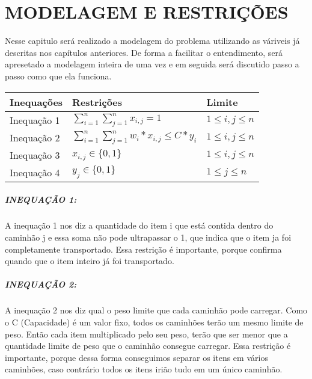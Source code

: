 \chapter{MODELAGEM E RESTRIÇÕES}
  Nesse capitulo será realizado a modelagem do problema utilizando as váriveis já descritas nos capítulos anteriores. De forma a facilitar o entendimento, será apresetado a modelagem inteira de uma vez e em seguida será discutido passo a passo como que ela funciona. 
  \begin{center}
    \begin{tabular}{|p{3cm}|p{5cm}|p{3cm}|}
      \hline
        Inequações & Restrições & Limite \\ 
      \hline
        Inequação 1 & \( \sum_{i=1}^{n} \sum_{j=1}^{n} x_{i,j} = 1\) & \( 1 \leq i,j \leq n  \)\\
      \hline
        Inequação 2 & \( \sum_{i=1}^{n} \sum_{j=1}^{n} w_{i}*x_{i,j} \leq C*y_{i}\) & \( 1 \leq i,j \leq n  \)\\
      \hline
        Inequação 3 & \(  x_{i,j} \in \{0,1\}  \) & \( 1 \leq i,j \leq n  \)\\
      \hline
        Inequação 4 & \(  y_{j} \in \{0, 1\} \) & \( 1 \leq j \leq n  \)\\
      \hline
    \end{tabular}
  \end{center}

\paragraph{INEQUAÇÃO 1:}
  A inequação 1 nos diz a quantidade do item i que está contida dentro do caminhão j e essa soma não pode ultrapassar o 1, que indica que o item ja foi completamente transportado. Essa restrição é importante, porque confirma quando que o item inteiro já foi transportado. \\

\paragraph{INEQUAÇÃO 2:}
  A inequação 2 nos diz qual o peso limite que cada caminhão pode carregar. Como o C (Capacidade) é um valor fixo, todos os caminhões terão um mesmo limite de peso. Então cada item multiplicado pelo seu peso, terão que ser menor que a quantidade limite de peso que o caminhão consegue carregar. Essa restrição é importante, porque dessa forma conseguimos separar os itens em vários caminhões, caso contrário todos os itens irião tudo em um único caminhão. 

